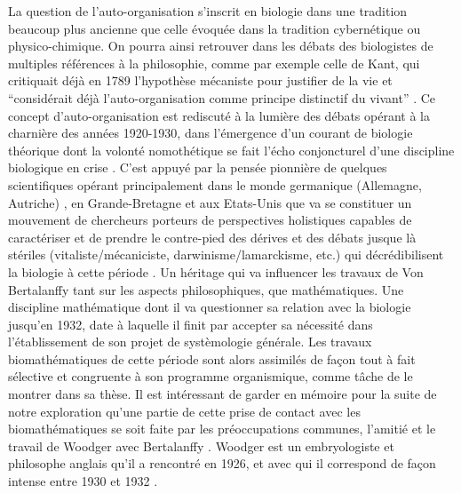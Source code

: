 La question de l'auto-organisation s'inscrit en biologie dans une tradition beaucoup plus ancienne que celle évoquée dans la tradition cybernétique ou physico-chimique. On pourra ainsi retrouver dans les débats des biologistes de multiples références à la philosophie, comme par exemple celle de Kant, qui critiquait déjà en 1789 l'hypothèse mécaniste pour justifier de la vie et \enquote{considérait déjà l'auto-organisation comme principe distinctif du vivant} \autocites[76]{Pouvreau2013}[275]{Mossio2010}[6]{Mossio2014}. Ce concept d'auto-organisation \autocite[68]{Stengers1985} est rediscuté à la lumière des débats opérant à la charnière des années 1920-1930, dans l'émergence d'un courant de biologie théorique dont la volonté nomothétique se fait l'écho conjoncturel d'une discipline biologique en crise \autocites[421-434]{Pouvreau2013}. C'est appuyé par la pensée pionnière de quelques scientifiques opérant principalement dans le monde germanique (Allemagne, Autriche) \autocite{Drack2007b}, en Grande-Bretagne et aux Etats-Unis que va se constituer un mouvement de chercheurs porteurs de perspectives holistiques capables de caractériser et de prendre le contre-pied des dérives et des débats jusque là stériles (vitaliste/mécaniciste, darwinisme/lamarckisme, etc.) qui décrédibilisent la biologie à cette période \autocite[153-154]{Pouvreau2013}. Un héritage qui va influencer les travaux de Von Bertalanffy tant sur les aspects philosophiques, que mathématiques. Une discipline mathématique dont il va questionner sa relation avec la biologie \autocite{Pouvreau2005} jusqu'en 1932, date à laquelle il finit par accepter sa nécessité dans l'établissement de son projet de systèmologie générale. Les travaux biomathématiques de cette période sont alors assimilés de façon tout à fait sélective et congruente à son programme organismique, comme tâche de le montrer \textcite[515]{Pouvreau2013} dans sa thèse. Il est intéressant de garder en mémoire pour la suite de notre exploration qu'une partie de cette prise de contact avec les biomathématiques se soit faite par les préoccupations communes, l'amitié et le travail de Woodger avec Bertalanffy \autocite[347,433]{Pouvreau2013}. Woodger est un embryologiste et philosophe anglais qu'il a rencontré en 1926, et avec qui il correspond de façon intense entre 1930 et 1932 \autocite[165]{Pouvreau2013}.

